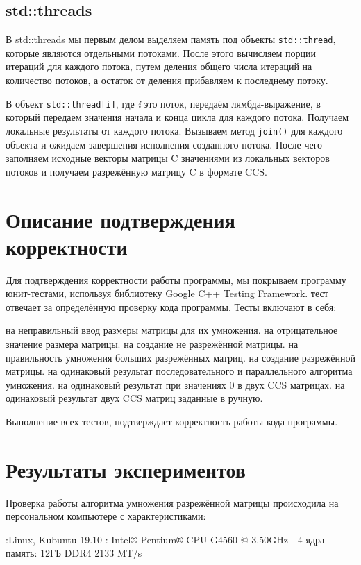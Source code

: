 \documentclass{report}
\begin{document}
	
	\subsection*{std::threads}
	В std::threads мы первым делом выделяем память под объекты \verb|std::thread|, которые являются отдельными потоками. После этого вычисляем порции итераций для каждого потока, путем деления общего числа итераций на количество потоков, а остаток от деления прибавляем к последнему потоку.
	\par В объект \verb|std::thread[i]|, где \emph{i} это поток, передаём лямбда-выражение, в который передаем значения начала и конца цикла для каждого потока. Получаем локальные результаты от каждого потока. Вызываем метод \verb|join()| для каждого объекта и ожидаем завершения исполнения созданного потока. После чего заполняем исходные векторы матрицы C значениями из локальных векторов потоков и получаем разрежённую матрицу C в формате CCS.
	\newpage
	
	\section*{Описание подтверждения корректности}
	Для подтверждения корректности работы программы, мы покрываем программу юнит-тестами, используя библиотеку Google C++ Testing Framework.
	 тест отвечает за определённую проверку кода программы. Тесты включают в себя:
	\begin{itemize}
		 на неправильный ввод размеры матрицы для их умножения.
		 на отрицательное значение размера матрицы.
		 на создание не разрежённой матрицы.
		 на правильность умножения больших разрежённых матриц.
		 на создание разрежённой матрицы.
		 на одинаковый результат последовательного и параллельного алгоритма умножения.
		 на одинаковый результат при значениях 0 в двух CCS матрицах.
		 на одинаковый результат двух CCS матриц заданные в ручную. 
	\end{itemize}  
	
	\par Выполнение всех тестов, подтверждает корректность работы кода программы.
	\newpage
	
	\section*{Результаты экспериментов}
	\addcontentsline{toc}{section}{Результаты экспериментов}
	Проверка работы алгоритма умножения разрежённой матрицы происходила на персональном компьютере с характеристиками:
	\begin{itemize}
		:Linux, Kubuntu 19.10
		: Intel® Pentium® CPU G4560 @ 3.50GHz - 4 ядра
		 память: 12ГБ DDR4 2133 MT/s
	\end{itemize}
\end{document}
